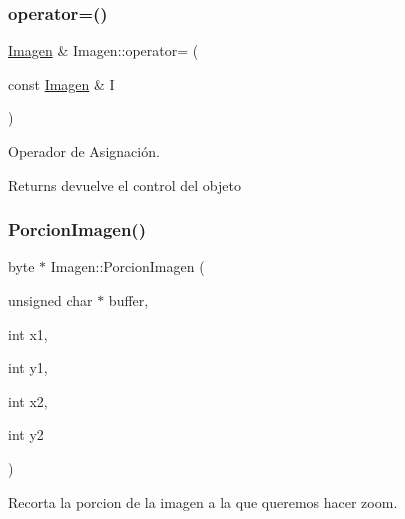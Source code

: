 \subsubsection{\texorpdfstring{operator=()}{operator=()}}
{\footnotesize\ttfamily \hyperlink{class_imagen}{Imagen} \& Imagen\+::operator= (\begin{DoxyParamCaption}\item[{const \hyperlink{class_imagen}{Imagen} \&}]{I }\end{DoxyParamCaption})}



Operador de Asignación. 

\begin{DoxyReturn}{Returns}
devuelve el control del objeto 
\end{DoxyReturn}
\mbox{\label{class_imagen_ac59016db29b9e8857e41a5c0e47b213a}} 
\subsubsection{\texorpdfstring{Porcion\+Imagen()}{PorcionImagen()}}
{\footnotesize\ttfamily byte $\ast$ Imagen\+::\+Porcion\+Imagen (\begin{DoxyParamCaption}\item[{unsigned char $\ast$}]{buffer,  }\item[{int}]{x1,  }\item[{int}]{y1,  }\item[{int}]{x2,  }\item[{int}]{y2 }\end{DoxyParamCaption})}



Recorta la porcion de la imagen a la que queremos hacer zoom. 


